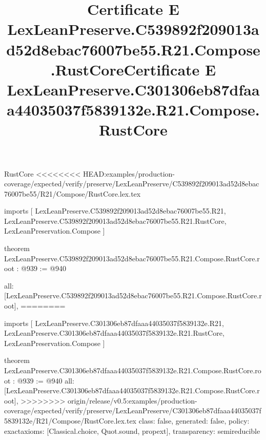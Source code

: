\begin{lexlean}{RustCore}
<<<<<<<< HEAD:examples/production-coverage/expected/verify/preserve/LexLeanPreserve/C539892f209013ad52d8ebac76007be55/R21/Compose/RustCore.lex.tex
\title{Certificate E LexLeanPreserve.C539892f209013ad52d8ebac76007be55.R21.Compose.RustCore}
\begin{coremodule}
imports [
  LexLeanPreserve.C539892f209013ad52d8ebac76007be55.R21,
  LexLeanPreserve.C539892f209013ad52d8ebac76007be55.R21.RustCore,
  LexLeanPreservation.Compose
]

theorem LexLeanPreserve.C539892f209013ad52d8ebac76007be55.R21.Compose.RustCore.root : @939 := @940 {
  all: [LexLeanPreserve.C539892f209013ad52d8ebac76007be55.R21.Compose.RustCore.root],
========
\title{Certificate E LexLeanPreserve.C301306eb87dfaaa44035037f5839132e.R21.Compose.RustCore}
\begin{coremodule}
imports [
  LexLeanPreserve.C301306eb87dfaaa44035037f5839132e.R21,
  LexLeanPreserve.C301306eb87dfaaa44035037f5839132e.R21.RustCore,
  LexLeanPreservation.Compose
]

theorem LexLeanPreserve.C301306eb87dfaaa44035037f5839132e.R21.Compose.RustCore.root : @939 := @940 {
  all: [LexLeanPreserve.C301306eb87dfaaa44035037f5839132e.R21.Compose.RustCore.root],
>>>>>>>> origin/release/v0.5:examples/production-coverage/expected/verify/preserve/LexLeanPreserve/C301306eb87dfaaa44035037f5839132e/R21/Compose/RustCore.lex.tex
  class: false,
  generated: false,
  policy: exact{axioms: [Classical.choice, Quot.sound, propext]},
  transparency: semireducible
}


\end{coremodule}}
\end{coremodule}
\end{lexlean}
